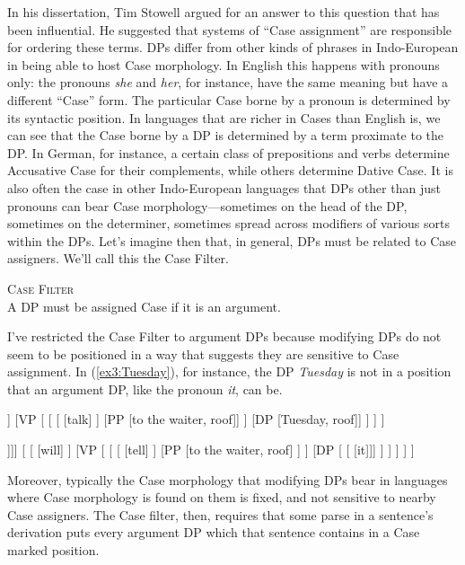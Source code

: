 In his dissertation,\nocite{Stowell:1981} Tim Stowell argued for an answer to this question that has been influential. He suggested that systems of ``Case assignment'' are responsible for ordering these terms. DPs differ from other kinds of phrases in Indo-European in being able to host Case morphology. In English this happens with pronouns only: the pronouns \emph{she} and \emph{her}, for instance, have the same meaning but have a different ``Case'' form. The particular Case borne by a pronoun is determined by its syntactic position. In languages that are richer in Cases than English is, we can see that the Case borne by a DP is determined by a term proximate to the DP. In German, for instance, a certain class of prepositions and verbs determine Accusative Case for their complements, while others determine Dative Case. It is also often the case in other Indo-European languages that DPs other than just pronouns can bear Case morphology---sometimes on the head of the DP, sometimes on the determiner, sometimes spread across modifiers of various sorts within the DPs. Let's imagine then that, in general, DPs must be related to Case assigners. We'll call this the Case Filter.
\begin{exe}
	\ex \label{ex3:.21} \textsc{Case Filter}\\ 
		A DP must be assigned Case if it is an argument.
\end{exe}
I've restricted the Case Filter to argument DPs because modifying DPs do not seem to be positioned in a way that suggests they are sensitive to Case assignment. In (\ref{ex3:Tuesday}), for instance, the DP \emph{Tuesday} is not in a position that an argument DP, like the pronoun \emph{it}, can be.
\begin{exe}
	\raggedright
	\ex \label{ex3:Tuesday} 
	\small
	\begin{forest}
	[\ibar{I}
		[\obar{I} [will] ]
		[VP [ 
			[
				[ [talk] ]
				[PP [to the waiter, roof]]
			 ]
			[DP [Tuesday, roof]]
		] ]
	]
	\end{forest}
	\ex
	\begin{forest}
	[IP
		[DP [\ibar{D} [\obar{D} [she]]]]
		[ 
			[ [will] ]
			[VP [ 
				[
					[ [tell] ]
					[PP [to the waiter, roof] ]
				 ]
				[DP [ [ [it]]] ]
			] ]
		 ]
	]
	\end{forest}
\end{exe}
Moreover, typically the Case morphology that modifying DPs bear in languages where Case morphology is found on them is fixed, and not sensitive to nearby Case assigners. The Case filter, then, requires that some parse in a sentence's derivation puts every argument DP which that sentence contains in a Case marked position.

